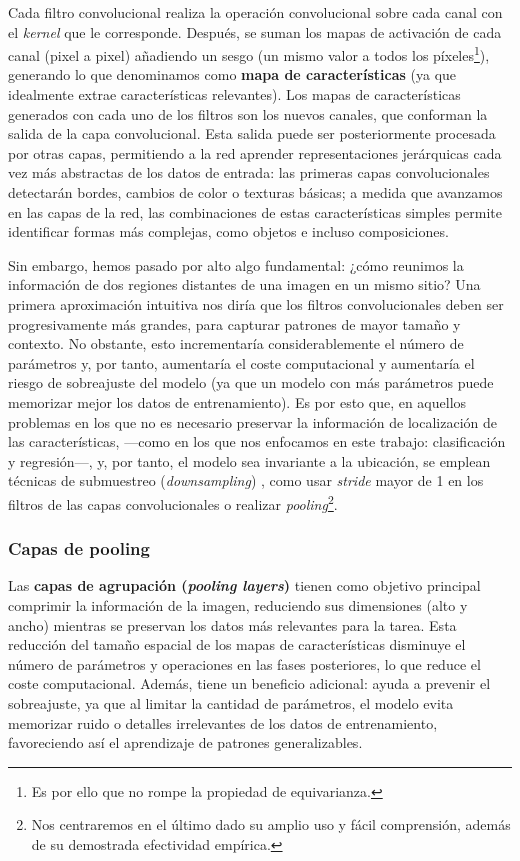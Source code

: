 Cada filtro convolucional realiza la operación convolucional sobre cada canal con el \textit{kernel} que le 
corresponde. Después, se suman los mapas de activación de cada canal (pixel a pixel) añadiendo un sesgo 
(un mismo valor a todos los píxeles\footnote{
    Es por ello que no rompe la propiedad de equivarianza.
}), 
generando lo que denominamos como \textbf{mapa de características} (ya que idealmente extrae características 
relevantes). Los mapas de características generados con cada uno de los filtros son los nuevos canales, que
conforman la salida de la capa convolucional. Esta salida puede ser posteriormente procesada por otras capas,
permitiendo a la red aprender representaciones jerárquicas cada vez más abstractas de los datos de entrada:
las primeras capas convolucionales detectarán bordes, cambios de color o texturas básicas; a medida que 
avanzamos en las capas de la red, las combinaciones de estas características simples permite identificar 
formas más complejas, como objetos e incluso composiciones.

Sin embargo, hemos pasado por alto algo fundamental: ¿cómo reunimos la información de dos regiones distantes 
de una imagen en un mismo sitio? Una primera aproximación intuitiva nos diría que los filtros convolucionales 
deben ser progresivamente más grandes, para capturar patrones de mayor tamaño y contexto. No obstante, esto
incrementaría considerablemente el número de parámetros y, por tanto, aumentaría el coste computacional y 
aumentaría el riesgo de sobreajuste del modelo (ya que un modelo con más parámetros puede memorizar mejor los
datos de entrenamiento). Es por esto que, en aquellos problemas en los que no es necesario preservar la 
información de localización de las características, ---como en los que nos enfocamos en este trabajo: 
clasificación y regresión---, y, por tanto, el modelo sea invariante a la ubicación, se emplean técnicas de 
submuestreo (\textit{downsampling}) \cite{murphy2022}, como usar \textit{stride} mayor de 1 en los filtros
de las capas convolucionales o realizar \textit{pooling}\footnote{
    Nos centraremos en el último dado su amplio uso y fácil comprensión, además de su demostrada efectividad 
    empírica.
}.



\subsubsection{Capas de pooling}

Las \textbf{capas de agrupación (\textit{pooling layers})} tienen como objetivo principal comprimir la 
información de la imagen, reduciendo sus dimensiones (alto y ancho) mientras se preservan los datos más 
relevantes para la tarea. Esta reducción del tamaño espacial de los mapas de características disminuye el 
número de parámetros y operaciones en las fases posteriores, lo que reduce el coste computacional. Además, 
tiene un beneficio adicional: ayuda a prevenir el sobreajuste, ya que al limitar la cantidad de parámetros, 
el modelo evita memorizar ruido o detalles irrelevantes de los datos de entrenamiento, favoreciendo así el 
aprendizaje de patrones generalizables.

